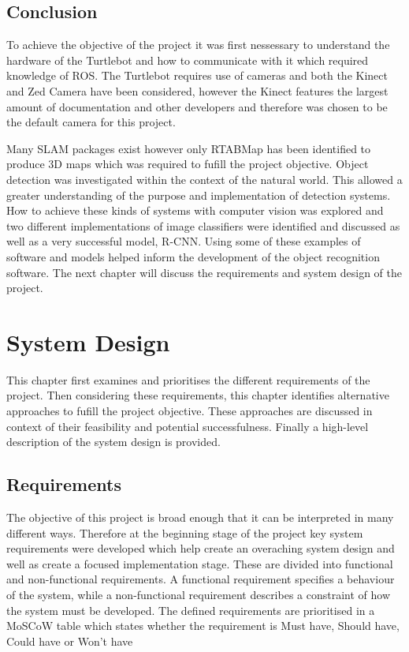 \documentclass{mproj}
\begin{document}
\section{Conclusion}

To achieve the objective of the project it was first nessessary to understand the hardware of the Turtlebot and how to communicate with it which required knowledge of ROS. The Turtlebot requires use of cameras and both the Kinect and Zed Camera have been considered, however the Kinect features the largest amount of documentation and other developers and therefore was chosen to be the default camera for this project. 

Many SLAM packages exist however only RTABMap has been identified to produce 3D maps which was required to fufill the project objective. Object detection was investigated within the context of the natural world. This allowed a greater understanding of the purpose and implementation of detection systems. How to achieve these kinds of systems with computer vision was explored and two different implementations of image classifiers were identified and discussed as well as a very successful model, R-CNN. Using some of these examples of software and models helped inform the development of the object recognition software. The next chapter will discuss the requirements and system design of the project.

\chapter{System Design}

This chapter first examines and prioritises the different requirements of the project. Then considering these requirements, this chapter identifies alternative approaches to fufill the project objective. These approaches are discussed in context of their feasibility and potential successfulness. Finally a high-level description of the system design is provided. 

\section{Requirements}
 
The objective of this project is broad enough that it can be interpreted in many different ways. Therefore at the beginning stage of the project key system requirements were developed which help create an overaching system design and well as create a focused implementation stage. These are divided into functional and non-functional requirements. A functional requirement specifies a behaviour of the system, while a non-functional requirement describes a constraint of how the system must be developed. The defined requirements are prioritised in a MoSCoW table which states whether the requirement is Must have, Should have, Could have or Won’t have
\end{document}
